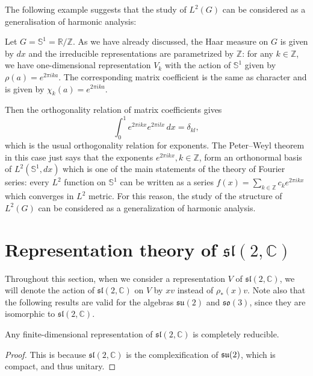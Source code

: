 \documentclass{report}
\begin{document}
The following example suggests that the study of $L^2(G)$ can be considered as a generalisation of harmonic analysis:
\begin{example}\label{ex:peter_wheyl_fourier}
    Let \( G = \mathbb S^1 = \mathbb{R}/\mathbb{Z} \). 
    As we have already discussed, the Haar measure on \( G \) is given by \( dx \) and the irreducible representations are parametrized by \( \mathbb{Z} \): for any \( k \in \mathbb{Z} \), we have one-dimensional representation \( V_k \) with the action of \( \mathbb S^1 \) given by \( \rho(a) = e^{2\pi i k a} \). The corresponding matrix coefficient is the same as character and is given by \( \chi_k(a) = e^{2\pi i k a} \).

Then the orthogonality relation of matrix coefficients gives
\[
\int_0^1 e^{2\pi i k x} e^{2\pi i l x} \, dx = \delta_{k l},
\]
which is the usual orthogonality relation for exponents. The Peter–Weyl theorem in this case just says that the exponents \( e^{2\pi i k x}, k \in \mathbb{Z} \), form an orthonormal basis of \( L^2(\mathbb S^1, dx) \) which is one of the main statements of the theory of Fourier series: every \( L^2 \) function on \( \mathbb S^1 \) can be written as a series \( f(x) = \sum_{k \in \mathbb{Z}} c_k e^{2\pi i k x} \) which converges in \( L^2 \) metric. For this reason, the study of the structure of \( L^2(G) \) can be considered as a generalization of harmonic analysis.
\end{example}

\section{Representation theory of $\mathfrak{sl}(2, \mathbb C)$}\label{sec:representation_theory_sl2}
Throughout this section, when we consider a representation $V$ of $\mathfrak{sl}(2, \mathbb C)$, we will denote the action of $\mathfrak{sl}(2, \mathbb C)$ on $V$ by $x v$ instead of $\rho_*(x)v$.
Note also that the following results are valid for the algebras $\mathfrak{su}(2)$ and $\mathfrak{so}(3)$, since they are isomorphic to $\mathfrak{sl}(2, \mathbb C)$.
\begin{theorem}
    Any finite-dimensional representation of $\mathfrak{sl}(2, \mathbb C)$ is completely reducible.
\end{theorem}
\begin{proof}
    This is because $\mathfrak{sl}(2, \mathbb C)$ is the complexification of $\operatorname{{\mathfrak{su}}}(2)$, which is compact, and thus unitary.
\end{proof}
\end{document}
